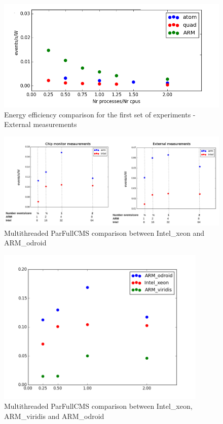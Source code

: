 \begin{figure}[h!]
  \centering
    \includegraphics[width=150mm]{"img/aalto/aalto_all_results"}
    \caption{Energy efficiency comparison for the first set of experiments - External measurements}
    \label{fig:aalto_all_results}
\end{figure}


\begin{figure}[h!]
  \centering
    \includegraphics[width=150mm]{"img/acat/results1"}
    \caption{Multithreaded ParFullCMS comparison between Intel\_xeon and ARM\_odroid}
    \label{fig:parfull_results}
\end{figure}

\begin{figure}[h!]
  \centering
    \includegraphics[width=100mm]{"img/aalto/parfull_results_aalto"}
    \caption{Multithreaded ParFullCMS comparison between Intel\_xeon, ARM\_viridis and ARM\_odroid}
    \label{fig:parfull_results_aalto}
\end{figure}


